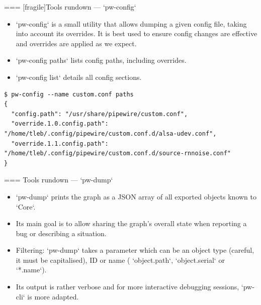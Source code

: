 === [fragile]{Tools rundown — `pw-config`}
  \begin{itemize}

  \item `pw-config` is a small utility that allows dumping a given
    config file, taking into account its overrides. It is best used to
    ensure config changes are effective and overrides are applied as we
    expect.

  \item `pw-config paths` lists config paths, including overrides.

  \item `pw-config list` details all config sections.

  \end{itemize}

    \begin{block}{}
      \fontsize{8}{8}\selectfont
        \begin{verbatim}
$ pw-config --name custom.conf paths
{
  "config.path": "/usr/share/pipewire/custom.conf",
  "override.1.0.config.path": "/home/tleb/.config/pipewire/custom.conf.d/alsa-udev.conf",
  "override.1.1.config.path": "/home/tleb/.config/pipewire/custom.conf.d/source-rnnoise.conf"
}
        \end{verbatim}
      \end{block}




=== {Tools rundown — `pw-dump`}
  \begin{itemize}

  \item `pw-dump` prints the graph as a JSON array of all exported
    objects known to `Core`.

  \item Its main goal is to allow sharing the graph’s overall state
    when reporting a bug or describing a situation.

  \item Filtering: `pw-dump` takes a parameter which can be an
    object type (careful, it must be capitalised), ID or name (
    `object.path`, `object.serial` or `*.name`).

  \item Its output is rather verbose and for more interactive debugging
    sessions, `pw-cli` is more adapted.

  \end{itemize}




